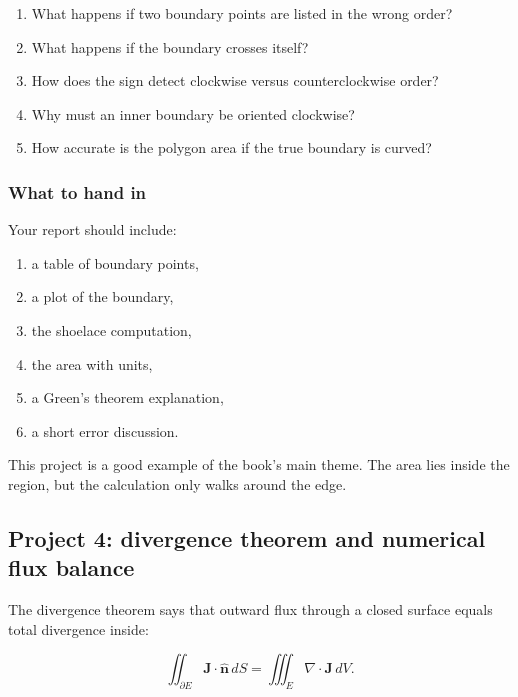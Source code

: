 \begin{enumerate}
\item What happens if two boundary points are listed in the wrong order?

\item What happens if the boundary crosses itself?

\item How does the sign detect clockwise versus counterclockwise order?

\item Why must an inner boundary be oriented clockwise?

\item How accurate is the polygon area if the true boundary is curved?
\end{enumerate}

\subsubsection*{What to hand in}

Your report should include:

\begin{enumerate}
\item a table of boundary points,

\item a plot of the boundary,

\item the shoelace computation,

\item the area with units,

\item a Green's theorem explanation,

\item a short error discussion.
\end{enumerate}

This project is a good example of the book's main theme.  The area lies inside the
region, but the calculation only walks around the edge.

\subsection{Project 4: divergence theorem and numerical flux balance}

The divergence theorem says that outward flux through a closed surface equals total
divergence inside:

\[
\boxed{
    \iint_{\partial E}\mathbf J\cdot\widehat{\mathbf n}\,dS
    =
    \iiint_E \nabla\cdot\mathbf J\,dV.
}
\]

